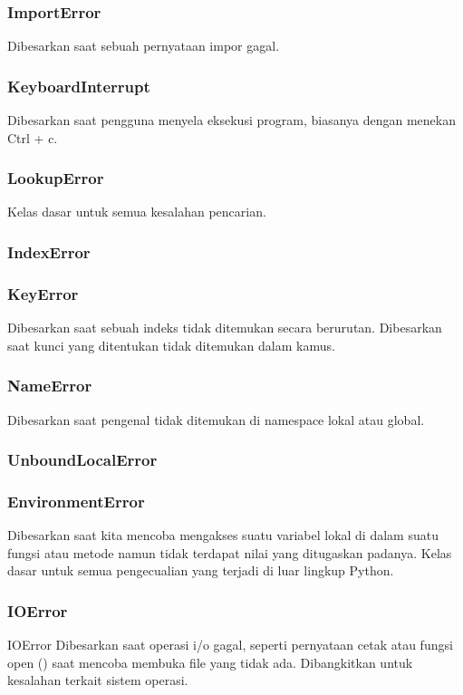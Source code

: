 \subsubsection{ImportError}
Dibesarkan saat sebuah pernyataan impor gagal.

\subsubsection{KeyboardInterrupt}
Dibesarkan saat pengguna menyela eksekusi program, biasanya dengan menekan Ctrl + c.

\subsubsection{LookupError}
Kelas dasar untuk semua kesalahan pencarian.

\subsubsection{IndexError}

\subsubsection{KeyError}
Dibesarkan saat sebuah indeks tidak ditemukan secara berurutan. Dibesarkan saat kunci yang ditentukan tidak ditemukan dalam kamus.

\subsubsection{NameError}
Dibesarkan saat pengenal tidak ditemukan di namespace lokal atau global.

\subsubsection{UnboundLocalError}

\subsubsection{EnvironmentError}
Dibesarkan saat kita mencoba mengakses suatu variabel lokal di dalam suatu fungsi atau metode namun tidak terdapat nilai yang ditugaskan padanya. Kelas dasar untuk semua pengecualian yang terjadi di luar lingkup Python.

\subsubsection{IOError}
IOError Dibesarkan saat operasi i/o gagal, seperti pernyataan cetak atau fungsi open () saat mencoba membuka file yang tidak ada. Dibangkitkan untuk kesalahan terkait sistem operasi.

